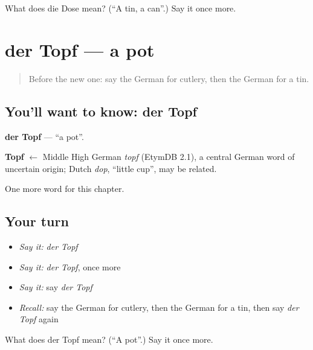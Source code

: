 \begin{tcolorbox}[breakable,colback=teal!4,colframe=teal!35!black,title={Before you move on}]
What does die Dose mean? (\textquotedblleft{}A tin, a can\textquotedblright{}.) Say it once more.
\end{tcolorbox}
\section[der Topf]{der Topf — a pot}

\label{lesson:GE-C201-topf}



\begin{quote}
Before the new one: say the German for cutlery, then the German for a tin.
\end{quote}

\subsection*{You'll want to know: der Topf}
\textbf{der Topf} — \textquotedblleft{}a pot\textquotedblright{}.

\begin{cousinweb}
\textbf{Topf} $\leftarrow$ Middle High German \emph{topf} (EtymDB 2.1), a central German word of uncertain origin; Dutch \emph{dop}, \textquotedblleft{}little cup\textquotedblright{}, may be related.
\end{cousinweb}

\begin{grammarlens}[title={What you've built}]
One more word for this chapter.
\end{grammarlens}

\subsection*{Your turn}
\begin{itemize}
\raggedright
  \item \emph{Say it:} \emph{der Topf}
  \item \emph{Say it:} \emph{der Topf}, once more
  \item \emph{Say it:} say \emph{der Topf}
  \item \emph{Recall:} say the German for cutlery, then the German for a tin, then say \emph{der Topf} again
\end{itemize}

\begin{tcolorbox}[breakable,colback=teal!4,colframe=teal!35!black,title={Before you move on}]
What does der Topf mean? (\textquotedblleft{}A pot\textquotedblright{}.) Say it once more.
\end{tcolorbox}

